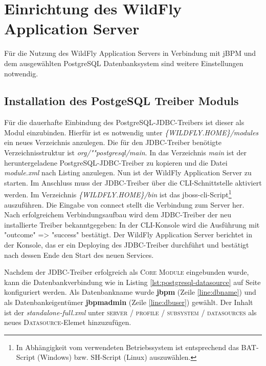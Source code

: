 \section{Einrichtung des WildFly Application Server}
Für die Nutzung des WildFly Application Servers in Verbindung mit jBPM und dem ausgewählten PostgreSQL Datenbanksystem sind weitere Einstellungen notwendig.

\subsection{Installation des PostgeSQL Treiber Moduls}
Für die dauerhafte Einbindung des PostgreSQL-JDBC-Treibers ist dieser als Modul einzubinden. Hierfür ist es notwendig unter \emph{\{WILDFLY.HOME\}/modules} ein neues Verzeichnis anzulegen. Die für den JDBC-Treiber benötigte Verzeichnisstruktur ist \emph{org/""postgresql/main}. In das Verzeichnis \emph{main} ist der heruntergeladene PostgreSQL-JDBC-Treiber zu kopieren und die Datei \emph{module.xml} nach Listing  anzulegen. Nun ist der WildFly Application Server zu starten.
Im Anschluss muss der JDBC-Treiber über die CLI-Schnittstelle aktiviert werden. Im Verzeichnis \emph{\{WILDFLY.HOME\}/bin} ist das jboss-cli-Script\footnote{In Abhängigkeit vom verwendeten Betriebssystem ist entsprechend das BAT-Script (Windows) bzw. SH-Script (Linux) auszuwählen.} auszuführen.
Die Eingabe von {\ttfamily connect} stellt die Verbindung zum Server her. Nach erfolgreichem Verbindungsaufbau wird dem JDBC-Treiber der neu installierte Treiber bekanntgegeben: 
In der CLI-Konsole wird die Ausführung mit {\ttfamily "{}outcome"{} => "{}success"{}} bestätigt. Der WildFly Application Server berichtet in der Konsole, das er ein {\ttfamily Deploying} des JDBC-Treiber durchführt und bestätigt nach dessen Ende den Start des neuen Services.

Nachdem der JDBC-Treiber erfolgreich als \textsc{Core Module} eingebunden wurde, kann die Datenbankverbindung wie in Listing \ref{lst:postgresql-datasource} auf Seite \pageref{lst:postgresql-datasource} konfiguriert werden.
Als Datenbankname wurde \textbf{jbpm} (Zeile \ref{line:dbname}) und als Datenbankeigentümer \textbf{jbpmadmin} (Zeile \ref{line:dbuser}) gewählt. Der Inhalt ist der \emph{standalone-full.xml} unter \textsc{server / profile / subsystem / datasources} als neues \textsc{Datasource}-Elemet hinzuzufügen.